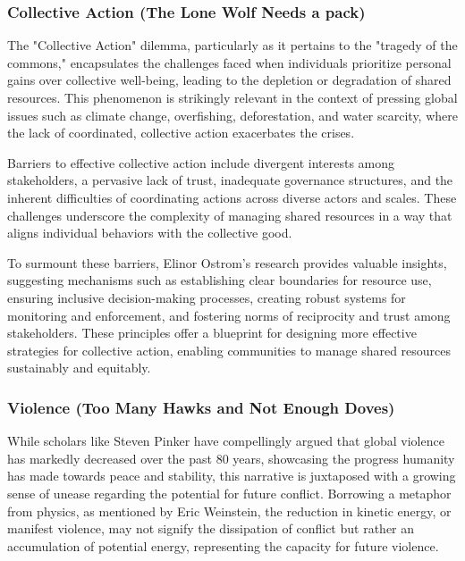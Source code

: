 \documentclass{article}
\begin{document}
\subsubsection{Collective Action (The Lone Wolf Needs a pack)}
\label{sec:CollectiveAction}

The "Collective Action" dilemma, particularly as it pertains to the "tragedy of the commons," encapsulates the challenges faced when individuals prioritize personal gains over collective well-being, leading to the depletion or degradation of shared resources\cite{Hardin1968}. This phenomenon is strikingly relevant in the context of pressing global issues such as climate change, overfishing, deforestation, and water scarcity, where the lack of coordinated, collective action exacerbates the crises\cite{IPCC2014, FAO2020, WorldBank2019}.

Barriers to effective collective action include divergent interests among stakeholders, a pervasive lack of trust, inadequate governance structures, and the inherent difficulties of coordinating actions across diverse actors and scales. These challenges underscore the complexity of managing shared resources in a way that aligns individual behaviors with the collective good\cite{Ostrom1990}.

To surmount these barriers, Elinor Ostrom's research provides valuable insights, suggesting mechanisms such as establishing clear boundaries for resource use, ensuring inclusive decision-making processes, creating robust systems for monitoring and enforcement, and fostering norms of reciprocity and trust among stakeholders\cite{Ostrom1990}. These principles offer a blueprint for designing more effective strategies for collective action, enabling communities to manage shared resources sustainably and equitably.

\subsubsection{Violence (Too Many Hawks and Not Enough Doves)}
\label{sec:Violence}

While scholars like Steven Pinker have compellingly argued that global violence has markedly decreased over the past 80 years, showcasing the progress humanity has made towards peace and stability\cite{Pinker2011}, this narrative is juxtaposed with a growing sense of unease regarding the potential for future conflict. Borrowing a metaphor from physics, as mentioned by Eric Weinstein, the reduction in kinetic energy, or manifest violence, may not signify the dissipation of conflict but rather an accumulation of potential energy, representing the capacity for future violence\cite{WeinsteinPodcast}.
\end{document}
